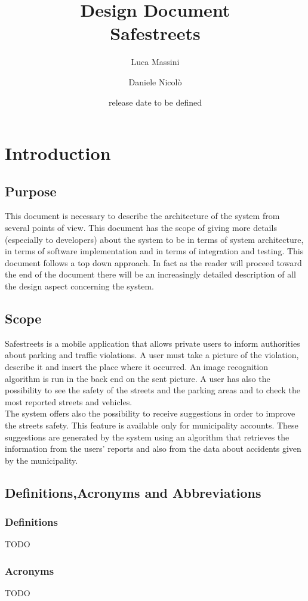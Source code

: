 \documentclass[titlepage]{article}
\author{Luca Massini \and Daniele Nicolò}
\title{Design Document
\\  Safestreets}
\date{release date to be defined}
\begin{document}
\maketitle
\newpage 
\tableofcontents
\newpage
\section{Introduction}
\subsection{Purpose}
	This document is necessary to describe the architecture of the system from several points of view. This document has the scope of giving more details (especially to developers) about the system to be in terms of system architecture, in terms of software implementation and in terms of integration and testing. This document follows a top down approach. In fact as the reader will proceed toward the end of the document there will be an increasingly detailed description of all the design aspect concerning the system.
\subsection{Scope}
Safestreets is a mobile application that allows private users to inform authorities about parking and traffic violations. A user must take a picture of the violation, describe it and  insert the place where it occurred. An image recognition algorithm is run in the  back end on the sent picture. A user has also the possibility to see the safety of the streets and the parking areas and to check the most reported streets and vehicles. \\
The system offers also the possibility to receive suggestions in order to improve the streets safety. This feature is available only for municipality accounts. These  suggestions are generated by the system using an algorithm that retrieves the information from the users' reports and also from the data about accidents given by the municipality.
\subsection{Definitions,Acronyms and Abbreviations}
\subsubsection{Definitions}
TODO
\subsubsection{Acronyms}
TODO
\end{document}
